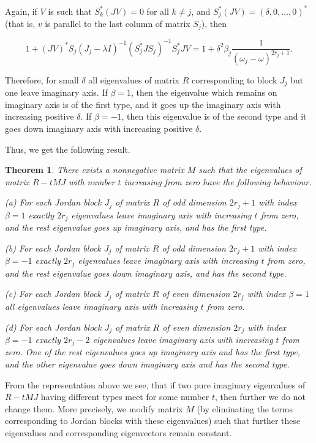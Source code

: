 \documentclass[11pt, reqno]{amsart}
\theoremstyle{plain}
\newtheorem{theorem}{Theorem}[section]
\begin{document}
Again, if $V$ is such that $S_{k}^{*}(JV)=0$ for all $k\ne j$, and $S_{j}^{*}(JV)=(\delta,0,\ldots,0)^{*}$ (that is, $v$ is parallel to the last column of matrix $S_{j}$), then 

$$ 1+(JV)^{*}S_{j}(J_{j}-\lambda I)^{-1}(S_{j}^{*}JS_{j})^{-1}S_{j}^{*}JV = 
1+\delta^{2}\beta_{j} \frac{1}{(\omega_{j}-\omega)^{2r_{j}+1}}.
$$

Therefore, for small $\delta$ all eigenvalues of matrix $R$ corresponding to block $J_{j}$ but one leave imaginary axis. If $\beta=1$, then the eigenvalue which remains on imaginary axis is of the first type, and it goes up the imaginary axis with increasing positive $\delta$. If $\beta=-1$, then this eigenvalue is of the second type and it goes down imaginary axis with increasing positive $\delta$. 

Thus, we get the following result.

\begin{theorem}
There exists a nonnegative matrix $M$ such that the eigenvalues of matrix $R-tMJ$ with number $t$ increasing from zero have the following behaviour.

(a) For each Jordan block $J_{j}$ of matrix $R$ of odd dimension $2r_{j}+1$ with index $\beta=1$ exactly $2r_{j}$ eigenvalues leave imaginary axis with increasing $t$ from zero, and the rest eigenvalue goes up imaginary axis, and has the first type.

(b) For each Jordan block $J_{j}$ of matrix $R$ of odd dimension $2r_{j}+1$ with index $\beta=-1$ exactly $2r_{j}$ eigenvalues leave imaginary axis with increasing $t$ from zero, and the rest eigenvalue goes down imaginary axis, and has the second type.

(c) For each Jordan block $J_{j}$ of matrix $R$ of even dimension $2r_{j}$ with index $\beta=1$ all eigenvalues leave imaginary axis with increasing $t$ from zero.

(d) For each Jordan block $J_{j}$ of matrix $R$ of even dimension $2r_{j}$ with index $\beta=-1$ exactly $2r_{j}-2$ eigenvalues leave imaginary axis with increasing $t$ from zero. One of the rest eigenvalues goes up imaginary axis and has the first type, and the other eigenvalue goes down imaginary axis and has the second type.
\end{theorem}

From the representation above we see, that if two pure imaginary eigenvalues of $R-tMJ$ having different types meet for some number $t$, then further we do not change them. More precisely, we modify matrix $M$ (by eliminating the terms corresponding to Jordan blocks with these eigenvalues) such that further these eigenvalues and corresponding eigenvectors remain constant. 
\end{document}
